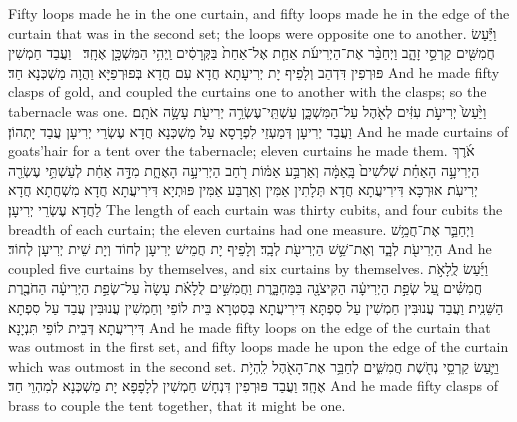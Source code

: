 {{Fifty loops made he in the one curtain, and fifty loops made he in the edge of the curtain that was in the second set; the loops were opposite one to another.}{}
{וַיַּ֕עַשׂ חֲמִשִּׁ֖ים קַרְסֵ֣י זָהָ֑ב וַיְחַבֵּ֨ר אֶת־הַיְרִיעֹ֜ת אַחַ֤ת אֶל־אַחַת֙ בַּקְּרָסִ֔ים וַֽיְהִ֥י הַמִּשְׁכָּ֖ן אֶחָֽד׃ \petucha }
{וַעֲבַד חַמְשִׁין פּוּרְפִין דִּדְהַב וְלָפֵיף יָת יְרִיעָתָא חֲדָא עִם חֲדָא בְּפוּרְפַיָּא וַהֲוָה מַשְׁכְּנָא חַד׃}
{And he made fifty clasps of gold, and coupled the curtains one to another with the clasps; so the tabernacle was one.}{}
{וַיַּ֙עַשׂ֙ יְרִיעֹ֣ת עִזִּ֔ים לְאֹ֖הֶל עַל־הַמִּשְׁכָּ֑ן עַשְׁתֵּֽי־עֶשְׂרֵ֥ה יְרִיעֹ֖ת עָשָׂ֥ה אֹתָֽם׃}
{וַעֲבַד יְרִיעָן דְּמַעְזֵי לִפְרָסָא עַל מַשְׁכְּנָא חֲדָא עֶשְׂרֵי יְרִיעָן עֲבַד יָתְהוֹן׃}
{And he made curtains of goats’hair for a tent over the tabernacle; eleven curtains he made them.}{}
{אֹ֜רֶךְ הַיְרִיעָ֣ה הָאַחַ֗ת שְׁלֹשִׁים֙ בָּֽאַמָּ֔ה וְאַרְבַּ֣ע אַמּ֔וֹת רֹ֖חַב הַיְרִיעָ֣ה הָאֶחָ֑ת מִדָּ֣ה אַחַ֔ת לְעַשְׁתֵּ֥י עֶשְׂרֵ֖ה יְרִיעֹֽת׃}
{אוּרְכָּא דִּירִיעֲתָא חֲדָא תְּלָתִין אַמִּין וְאַרְבַּע אַמִּין פּוּתְיָא דִּירִיעֲתָא חֲדָא מִשְׁחֲתָא חֲדָא לַחֲדָא עֶשְׂרֵי יְרִיעָן׃}
{The length of each curtain was thirty cubits, and four cubits the breadth of each curtain; the eleven curtains had one measure.}{}
{וַיְחַבֵּ֛ר אֶת־חֲמֵ֥שׁ הַיְרִיעֹ֖ת לְבָ֑ד וְאֶת־שֵׁ֥שׁ הַיְרִיעֹ֖ת לְבָֽד׃}
{וְלָפֵיף יָת חֲמֵישׁ יְרִיעָן לְחוֹד וְיָת שֵׁית יְרִיעָן לְחוֹד׃}
{And he coupled five curtains by themselves, and six curtains by themselves.}{}
{וַיַּ֜עַשׂ לֻֽלָאֹ֣ת חֲמִשִּׁ֗ים עַ֚ל שְׂפַ֣ת הַיְרִיעָ֔ה הַקִּיצֹנָ֖ה בַּמַּחְבָּ֑רֶת וַחֲמִשִּׁ֣ים לֻלָאֹ֗ת עָשָׂה֙ עַל־שְׂפַ֣ת הַיְרִיעָ֔ה הַחֹבֶ֖רֶת הַשֵּׁנִֽית׃}
{וַעֲבַד עֲנוּבִּין חַמְשִׁין עַל סִפְתָּא דִּירִיעֲתָא בְּסִטְרָא בֵּית לוֹפֵי וְחַמְשִׁין עֲנוּבִּין עֲבַד עַל סִפְתָא דִּירִיעֲתָא דְּבֵית לוֹפֵי תִּנְיָנָא׃}
{And he made fifty loops on the edge of the curtain that was outmost in the first set, and fifty loops made he upon the edge of the curtain which was outmost in the second set.}{}
{וַיַּ֛עַשׂ קַרְסֵ֥י נְחֹ֖שֶׁת חֲמִשִּׁ֑ים לְחַבֵּ֥ר אֶת־הָאֹ֖הֶל לִֽהְיֹ֥ת אֶחָֽד׃}
{וַעֲבַד פּוּרְפִין דִּנְחָשׁ חַמְשִׁין לְלָפָפָא יָת מַשְׁכְּנָא לְמִהְוֵי חַד׃}
{And he made fifty clasps of brass to couple the tent together, that it might be one.}{}
}
